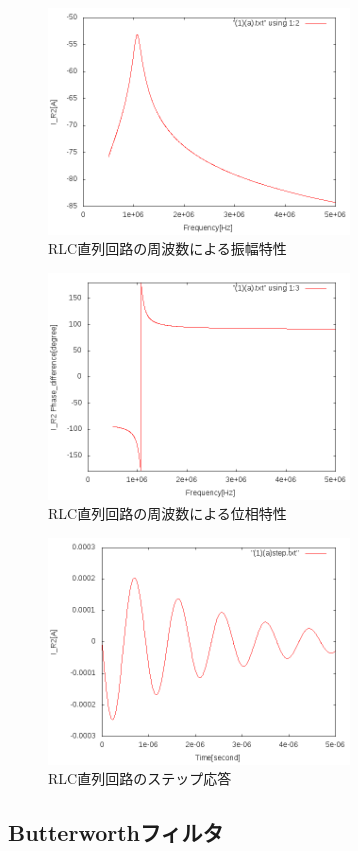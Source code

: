 \documentclass[10pt,a4j,dvipdfmx]{jsarticle}
\makeatletter
\let\@oldsubsec\subsection
\renewcommand{\subsection}[1]{\vspace{-7pt}\@oldsubsec{#1}}
\makeatother
\begin{document}
\begin{figure}[H]
  \centering
  \includegraphics[width=8cm]{1AC_Igraf.png}
  \caption{RLC直列回路の周波数による振幅特性}
\end{figure}

\begin{figure}[H]
  \centering
  \includegraphics[width=8cm]{1AC_Agraf.png}
  \caption{RLC直列回路の周波数による位相特性}
\end{figure}

\begin{figure}[H]
  \centering
  \includegraphics[width=8cm]{1stepgraf.png}
  \caption{RLC直列回路のステップ応答}
\end{figure}

\subsection{Butterworthフィルタ}
\end{document}
